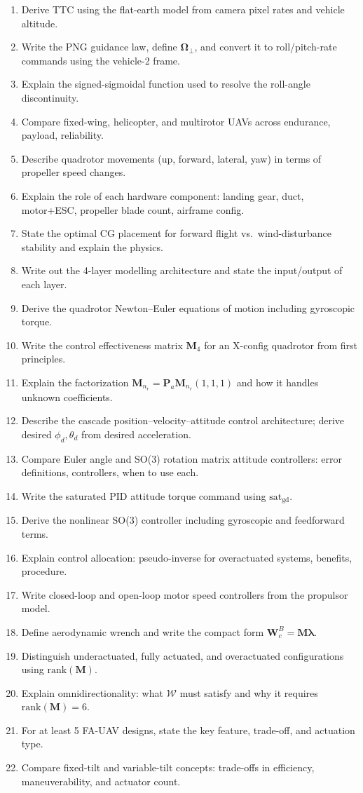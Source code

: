 \documentclass[11pt,a4paper]{article}
\newcommand{\vect}[1]{\bm{#1}}
\newcommand{\satgd}{\mathrm{sat}_\mathrm{gd}}
\begin{document}
\begin{enumerate}
  \item Derive TTC using the flat-earth model from camera pixel rates and vehicle altitude.
  \item Write the PNG guidance law, define $\vect\Omega_\perp$, and convert it to roll/pitch-rate commands using the vehicle-2 frame.
  \item Explain the signed-sigmoidal function used to resolve the roll-angle discontinuity.
  \item Compare fixed-wing, helicopter, and multirotor UAVs across endurance, payload, reliability.
  \item Describe quadrotor movements (up, forward, lateral, yaw) in terms of propeller speed changes.
  \item Explain the role of each hardware component: landing gear, duct, motor+ESC, propeller blade count, airframe config.
  \item State the optimal CG placement for forward flight vs.\ wind-disturbance stability and explain the physics.
  \item Write out the 4-layer modelling architecture and state the input/output of each layer.
  \item Derive the quadrotor Newton--Euler equations of motion including gyroscopic torque.
  \item Write the control effectiveness matrix $\mathbf{M}_4$ for an X-config quadrotor from first principles.
  \item Explain the factorization $\mathbf{M}_{n_r} = \mathbf{P}_a\mathbf{M}_{n_r}(1,1,1)$ and how it handles unknown coefficients.
  \item Describe the cascade position--velocity--attitude control architecture; derive desired $\phi_d,\theta_d$ from desired acceleration.
  \item Compare Euler angle and SO(3) rotation matrix attitude controllers: error definitions, controllers, when to use each.
  \item Write the saturated PID attitude torque command using $\satgd$.
  \item Derive the nonlinear SO(3) controller including gyroscopic and feedforward terms.
  \item Explain control allocation: pseudo-inverse for overactuated systems, benefits, procedure.
  \item Write closed-loop and open-loop motor speed controllers from the propulsor model.
  \item Define aerodynamic wrench and write the compact form $\mathbf{W}_c^B = \mathbf{M}\vect\lambda$.
  \item Distinguish underactuated, fully actuated, and overactuated configurations using $\mathrm{rank}(\mathbf{M})$.
  \item Explain omnidirectionality: what $\mathcal{W}$ must satisfy and why it requires $\mathrm{rank}(\mathbf{M})=6$.
  \item For at least 5 FA-UAV designs, state the key feature, trade-off, and actuation type.
  \item Compare fixed-tilt and variable-tilt concepts: trade-offs in efficiency, maneuverability, and actuator count.
\end{enumerate}
\end{document}
